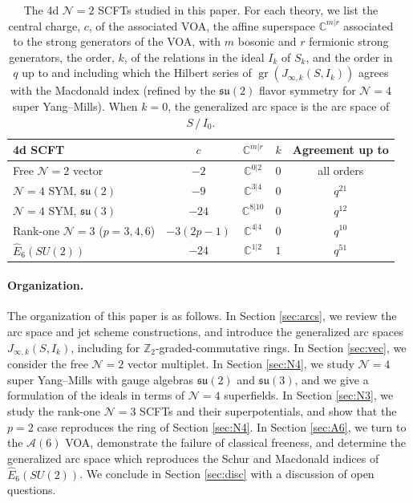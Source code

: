 \documentclass[12pt]{article}
\numberwithin{equation}{section}
\numberwithin{figure}{section}
\theoremstyle{plain}
\theoremstyle{definition}
\begin{document}
\begin{table}[H]
    \centering
    \renewcommand{\arraystretch}{1.3}
    \begin{tabular}{lcccc}
        \toprule
        4d SCFT & $c$ & $\mathbb{C}^{m|r}$ & $k$ & Agreement up to \\
        \midrule
        Free $\mathcal{N}=2$ vector & $-2$ & $\mathbb{C}^{0|2}$ & $0$ & all orders \\
        $\mathcal{N}=4$ SYM, $\mathfrak{su}(2)$ & $-9$ & $\mathbb{C}^{3|4}$ & $0$ & $q^{21}$ \\
        $\mathcal{N}=4$ SYM, $\mathfrak{su}(3)$ & $-24$ & $\mathbb{C}^{8|10}$ & $0$ & $q^{12}$ \\
        Rank-one $\mathcal{N}=3$ ($p = 3, 4, 6$) & $-3(2p-1)$ & $\mathbb{C}^{4|4}$ & $0$ & $q^{10}$ \\
        $\widehat{E}_6(SU(2))$ & $-24$ & $\mathbb{C}^{1|2}$ & $1$ & $q^{51}$ \\
        \bottomrule
    \end{tabular}
    \caption{The 4d $\mathcal{N}=2$ SCFTs studied in this paper. For each theory, we list the central charge, $c$, of the associated VOA, the affine superspace $\mathbb{C}^{m|r}$ associated to the strong generators of the VOA, with $m$ bosonic and $r$ fermionic strong generators, the order, $k$, of the relations in the ideal $I_k$ of $S_k$, and the order in $q$ up to and including which the Hilbert series of $\operatorname{gr}(J_{\infty,k}(S, I_k))$ agrees with the Macdonald index (refined by the $\mathfrak{su}(2)$ flavor symmetry for $\mathcal{N}=4$ super Yang--Mills). When $k = 0$, the generalized arc space is the arc space of $S \, / \, I_0$.
    }
    \label{tbl:summary}
\end{table}

\paragraph{Organization.} The organization of this paper is as follows. In Section \ref{sec:arcs}, we review the arc space and jet scheme constructions, and introduce the generalized arc spaces $J_{\infty,k}(S, I_k)$, including for $\mathbb{Z}_2$-graded-commutative rings. In Section \ref{sec:vec}, we consider the free $\mathcal{N}=2$ vector multiplet. In Section \ref{sec:N4}, we study $\mathcal{N}=4$ super Yang--Mills with gauge algebras $\mathfrak{su}(2)$ and $\mathfrak{su}(3)$, and we give a formulation of the ideals in terms of $\mathcal{N}=4$ superfields. In Section \ref{sec:N3}, we study the rank-one $\mathcal{N}=3$ SCFTs and their superpotentials, and show that the $p = 2$ case reproduces the ring of Section \ref{sec:N4}. In Section \ref{sec:A6}, we turn to the $\mathcal{A}(6)$ VOA, demonstrate the failure of classical freeness, and determine the generalized arc space which reproduces the Schur and Macdonald indices of $\widehat{E}_6(SU(2))$. We conclude in Section \ref{sec:disc} with a discussion of open questions.
\end{document}
